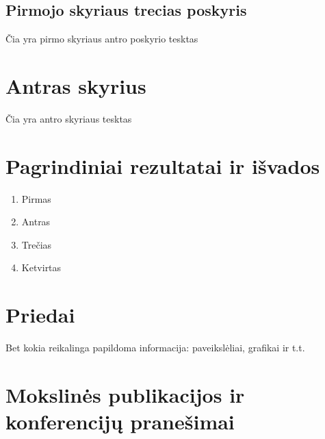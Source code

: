 \documentclass[a4paper, 12pt]{article} %
\begin{document}
\begin{onehalfspacing}
   \subsection{Pirmojo skyriaus trecias poskyris}

      \v{C}ia yra pirmo skyriaus antro poskyrio tesktas

\newpage %

\section{Antras skyrius}

  \v{C}ia yra antro skyriaus tesktas

\newpage
   
\section{Pagrindiniai rezultatai ir i\v{s}vados}


\begin{enumerate}
\item Pirmas
\item Antras 
\item Tre\v{c}ias
\item Ketvirtas
\end{enumerate}

\newpage

\section{Priedai}

Bet kokia reikalinga papildoma informacija: paveiksl\.{e}liai, grafikai ir t.t.

\end{onehalfspacing}

\newpage

\section*{Mokslin\.{e}s publikacijos ir konferencij\k{u} prane\v{s}imai}

\end{document}
